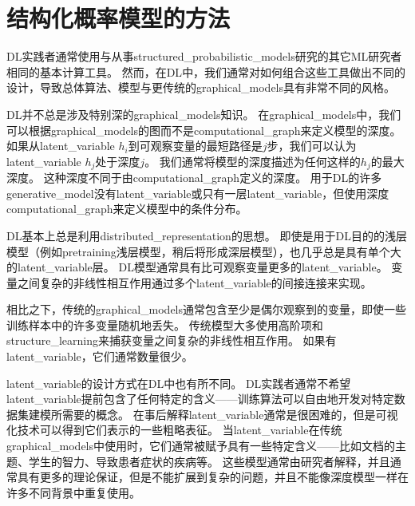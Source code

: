 \section{结构化概率模型的方法}
\label{sec:the_deep_learning_approach_to_structured_probabilistic_models}

\gls{DL}实践者通常使用与从事\gls{structured_probabilistic_models}研究的其它\gls{ML}研究者相同的基本计算工具。
然而，在\gls{DL}中，我们通常对如何组合这些工具做出不同的设计，导致总体算法、模型与更传统的\gls{graphical_models}具有非常不同的风格。


\gls{DL}并不总是涉及特别深的\gls{graphical_models}知识。
在\gls{graphical_models}中，我们可以根据\gls{graphical_models}的图而不是\gls{computational_graph}来定义模型的深度。
如果从\gls{latent_variable} $h_i$到可观察变量的最短路径是$j$步，我们可以认为\gls{latent_variable} $h_j$处于深度$j$。
我们通常将模型的深度描述为任何这样的$h_j$的最大深度。 
这种深度不同于由\gls{computational_graph}定义的深度。
用于\gls{DL}的许多\gls{generative_model}没有\gls{latent_variable}或只有一层\gls{latent_variable}，但使用深度\gls{computational_graph}来定义模型中的条件分布。


\gls{DL}基本上总是利用\gls{distributed_representation}的思想。
即使是用于\gls{DL}目的的浅层模型（例如\gls{pretraining}浅层模型，稍后将形成深层模型），也几乎总是具有单个大的\gls{latent_variable}层。
\gls{DL}模型通常具有比可观察变量更多的\gls{latent_variable}。
变量之间复杂的非线性相互作用通过多个\gls{latent_variable}的间接连接来实现。


相比之下，传统的\gls{graphical_models}通常包含至少是偶尔观察到的变量，即使一些训练样本中的许多变量随机地丢失。
传统模型大多使用高阶项和\gls{structure_learning}来捕获变量之间复杂的非线性相互作用。
如果有\gls{latent_variable}，它们通常数量很少。



\gls{latent_variable}的设计方式在\gls{DL}中也有所不同。
\gls{DL}实践者通常不希望\gls{latent_variable}提前包含了任何特定的含义——训练算法可以自由地开发对特定数据集建模所需要的概念。
在事后解释\gls{latent_variable}通常是很困难的，但是可视化技术可以得到它们表示的一些粗略表征。
当\gls{latent_variable}在传统\gls{graphical_models}中使用时，它们通常被赋予具有一些特定含义——比如文档的主题、学生的智力、导致患者症状的疾病等。
这些模型通常由研究者解释，并且通常具有更多的理论保证，但是不能扩展到复杂的问题，并且不能像深度模型一样在许多不同背景中重复使用。



